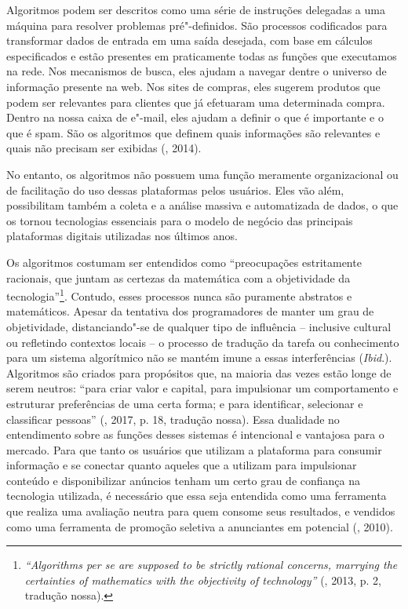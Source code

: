 Algoritmos podem ser descritos como uma série de instruções delegadas a
uma máquina para resolver problemas pré"-definidos. São processos
codificados para transformar dados de entrada em uma saída desejada, com
base em cálculos especificados e estão presentes em praticamente todas
as funções que executamos na rede. Nos mecanismos de busca, eles ajudam
a navegar dentre o universo de informação presente na web. Nos sites de
compras, eles sugerem produtos que podem ser relevantes para clientes
que já efetuaram uma determinada compra. Dentro na nossa caixa de
e"-mail, eles ajudam a definir o que é importante e o que é spam. São os
algoritmos que definem quais informações são relevantes e quais não
precisam ser exibidas (, 2014).

No entanto, os algoritmos não possuem uma função meramente
organizacional ou de facilitação do uso dessas plataformas pelos
usuários. Eles vão além, possibilitam também a coleta e a análise
massiva e automatizada de dados, o que os tornou tecnologias essenciais
para o modelo de negócio das principais plataformas digitais utilizadas
nos últimos anos.

Os algoritmos costumam ser entendidos como ``preocupações estritamente
racionais, que juntam as certezas da matemática com a objetividade da
tecnologia''\footnote{\emph{``Algorithms per se are supposed to be strictly
  rational concerns, marrying the certainties of mathematics with the
  objectivity of technology''} (, 2013, p. 2, tradução nossa).}.
Contudo, esses processos nunca são puramente abstratos e matemáticos.
Apesar da tentativa dos programadores de manter um grau de objetividade,
distanciando"-se de qualquer tipo de influência -- inclusive cultural ou
refletindo contextos locais -- o processo de tradução da tarefa ou
conhecimento para um sistema algorítmico não se mantém imune a essas
interferências (\emph{Ibid}.). Algoritmos são criados para propósitos que, na
maioria das vezes estão longe de serem neutros: ``para criar valor e
capital, para impulsionar um comportamento e estruturar preferências de
uma certa forma; e para identificar, selecionar e classificar
pessoas'' (, 2017, p. 18, tradução nossa). Essa dualidade no
entendimento sobre as funções desses sistemas é intencional e vantajosa
para o mercado. Para que tanto os usuários que utilizam a plataforma
para consumir informação e se conectar quanto aqueles que a utilizam
para impulsionar conteúdo e disponibilizar anúncios tenham um certo grau
de confiança na tecnologia utilizada, é necessário que essa seja
entendida como uma ferramenta que realiza uma avaliação neutra para quem
consome seus resultados, e vendidos como uma ferramenta de promoção
seletiva a anunciantes em potencial (, 2010).

